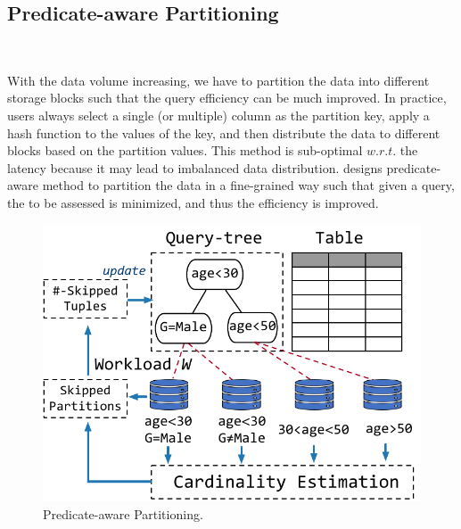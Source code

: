 \subsection{Predicate-aware Partitioning}~\label{subsec:partition}


With the data volume increasing, we  have to partition the data into different storage blocks such that the query efficiency can be much improved. In practice, users always select a single (or multiple) column as the partition key,  apply   a hash function to the values of the key, and then distribute the data to different blocks based on the partition values. This method is sub-optimal $w.r.t.$ the latency because it may lead to imbalanced data distribution. \brain  designs predicate-aware  method to partition the data in a fine-grained way such that given a query, the  to be assessed is minimized, and thus the efficiency is improved.


\begin{figure}[htbp]
	\includegraphics[scale=0.6]{figures/partition}
	\centering
	\vspace{-1em}
	\caption{Predicate-aware Partitioning.}
	\label{fig:partition}
	\vspace{-1em}
\end{figure}


